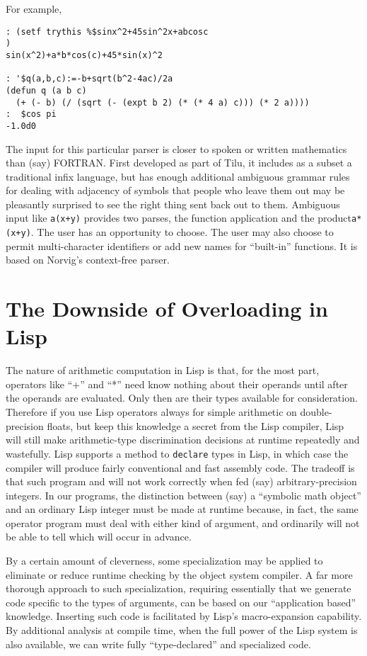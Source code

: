 \documentclass{article}
\begin{document}
{ For example,
\begin{verbatim}
: (setf trythis %$sinx^2+45sin^2x+abcosc
)
sin(x^2)+a*b*cos(c)+45*sin(x)^2

: '$q(a,b,c):=-b+sqrt(b^2-4ac)/2a
(defun q (a b c)
  (+ (- b) (/ (sqrt (- (expt b 2) (* (* 4 a) c))) (* 2 a))))
:  $cos pi
-1.0d0
\end{verbatim}

The input for this particular parser is closer
to spoken or written mathematics than (say) FORTRAN. First developed as
part of Tilu, it includes as a subset a traditional infix language, but
has enough additional ambiguous grammar rules for dealing with
adjacency of symbols that people who leave them out may be
pleasantly surprised to see the right thing sent back out to them.
Ambiguous input like {\tt a(x+y)} provides two parses,
the function application and the product{\tt a*(x+y)}. The user has an
opportunity to choose. The user may also choose to permit multi-character
identifiers or add new names for ``built-in'' functions. It is based on
Norvig's \cite{paip} context-free parser.

\section{The Downside of Overloading in Lisp}
The nature of arithmetic computation in Lisp is that, for the most part,
operators like ``+'' and ``*'' need know nothing about their operands
until after the operands are evaluated. Only then are their types
available for consideration.  Therefore if you use Lisp operators
always for simple arithmetic on double-precision floats, but keep
this knowledge a secret from the Lisp compiler, Lisp will
still make arithmetic-type discrimination decisions at runtime
repeatedly and wastefully. Lisp supports a method to {\tt declare}
types in Lisp, in which case the compiler will produce fairly
conventional and fast assembly code. The tradeoff is that such program
and will not work correctly when fed (say) arbitrary-precision
integers.  In our programs, the distinction between (say) a ``symbolic
math object'' and an ordinary Lisp integer must be made at runtime
because, in fact, the same operator program must deal with either kind
of argument, and ordinarily will not be able to tell which will occur
in advance.

By a certain amount of cleverness, some specialization may be applied
to eliminate or reduce runtime checking by the object system
compiler. A far more thorough approach to such specialization,
requiring essentially that we generate code specific to the types of
arguments, can be based on our ``application based''
knowledge. Inserting such code is facilitated by Lisp's
macro-expansion capability.  By additional analysis at compile time,
when the full power of the Lisp system is also available, we can write
fully ``type-declared'' and specialized code.

}
\end{document}
